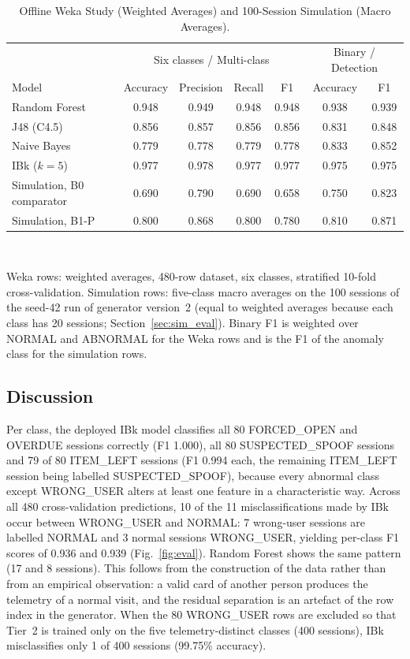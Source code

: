 \documentclass[journal,onecolumn]{IEEEtran}
\begin{document}
\begin{table}[!htbp]
\renewcommand{\arraystretch}{1.04}
\centering
\small
\caption{Offline Weka Study (Weighted Averages) and 100-Session Simulation (Macro Averages).}
\label{tab:ml}
\vspace{4pt}
\begin{tabular}{l c c c c c c}
\hline
 & \multicolumn{4}{c}{Six classes / Multi-class} & \multicolumn{2}{c}{Binary / Detection} \\
Model & Accuracy & Precision & Recall & F1 & Accuracy & F1 \\
\hline
\rule{0pt}{2.6ex}Random Forest & 0.948 & 0.949 & 0.948 & 0.948 & 0.938 & 0.939 \\
J48 (C4.5)    & 0.856 & 0.857 & 0.856 & 0.856 & 0.831 & 0.848 \\
Naive Bayes   & 0.779 & 0.778 & 0.779 & 0.778 & 0.833 & 0.852 \\
IBk ($k=5$)   & 0.977 & 0.978 & 0.977 & 0.977 & 0.975 & 0.975 \\
\hline
\rule{0pt}{2.6ex}Simulation, B0 comparator & 0.690 & 0.790 & 0.690 & 0.658 & 0.750 & 0.823 \\
Simulation, B1-P & 0.800 & 0.868 & 0.800 & 0.780 & 0.810 & 0.871 \\
\hline
\end{tabular}
\\[2pt]
\parbox{0.92\linewidth}{\footnotesize Weka rows: weighted averages, 480-row dataset, six classes, stratified 10-fold
cross-validation. Simulation rows: five-class macro averages on the 100 sessions of the seed-42 run of generator
version~2 (equal to weighted
averages because each class has 20 sessions; Section~\ref{sec:sim_eval}). Binary F1 is weighted over NORMAL and
ABNORMAL for the Weka rows and is the F1 of the anomaly class for the simulation rows.}
\end{table}

\subsection{Discussion}

Per class, the deployed IBk model classifies all 80 FORCED\_OPEN and OVERDUE sessions correctly (F1 1.000), all 80
SUSPECTED\_SPOOF sessions and 79 of 80 ITEM\_LEFT sessions (F1 0.994 each, the remaining ITEM\_LEFT session being
labelled SUSPECTED\_SPOOF), because every abnormal class except WRONG\_USER alters at least one feature in a
characteristic way. Across all 480 cross-validation predictions, 10 of the 11 misclassifications made by IBk occur
between WRONG\_USER and NORMAL: 7 wrong-user sessions are labelled NORMAL and 3 normal sessions WRONG\_USER, yielding
per-class F1 scores of 0.936 and 0.939 (Fig.~\ref{fig:eval}). Random Forest shows the same pattern (17 and 8 sessions).
This follows from the construction of the data rather than from an empirical observation: a valid card of another person
produces the telemetry of a normal visit, and the residual separation is an artefact of the row index in the generator.
When the 80 WRONG\_USER rows are excluded so that Tier~2 is trained only on the five telemetry-distinct classes
(400 sessions), IBk misclassifies only 1 of 400 sessions (99.75\% accuracy).
\end{document}
